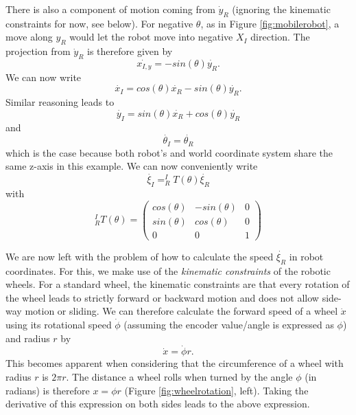 There is also a component of motion coming from $ \dot{y}_R$ (ignoring the kinematic constraints for now, see below).  For negative $ \theta$, as in Figure \ref{fig:mobilerobot}, a move along $y_R$ would let the robot move into negative $ X_I$ direction. The projection from $ \dot{y}_R$ is therefore given by 
\begin{equation}
\dot{x_{I,y}}=-sin(\theta)\dot{y_R}.
\end{equation} 
We can now write
\begin{equation}
\dot{x_I}=cos(\theta) \dot{x_R} - sin(\theta) \dot{y_R}.
\end{equation}
Similar reasoning leads to
\begin{equation}
\dot{y_I}=sin(\theta) \dot{x_R} + cos(\theta) \dot{y_R}
\end{equation}
and
\begin{equation}
\dot{\theta_I}=\dot{\theta_R}
\end{equation}
which is the case because both robot's and world coordinate system share the same z-axis in this example. We can now conveniently write
\begin{equation}
\dot{\xi_I}=^I_RT(\theta)\dot{\xi_R}
\end{equation}
with
\begin{equation}
^I_RT(\theta)=\left(\begin{array}{ccc}
cos(\theta) & -sin(\theta) & 0 \\
sin(\theta) & cos(\theta) & 0 \\
0 & 0 & 1\end{array}\right)
\end{equation}

We are now left with the problem of how to calculate the speed $ \dot{\xi_R}$ in robot coordinates. For this, we make use of the \emph{kinematic constraints} of the robotic wheels. For a standard wheel, the kinematic constraints are that every rotation of the wheel leads to strictly forward or backward motion and does not allow side-way motion or sliding. We can therefore calculate the forward speed of a wheel $ \dot{x}$ using its rotational speed $ \dot{\phi}$ (assuming the encoder value/angle is expressed as $ \phi$) and radius $ r$ by 
\begin{equation}
\dot{x}=\dot{\phi}r.
\end{equation}
This becomes apparent when considering that the circumference of a wheel with radius $ r$ is $ 2\pi r$. The distance a wheel rolls when turned by the angle $ \phi$ (in radians) is therefore $ x=\phi r$ (Figure \ref{fig:wheelrotation}, left). Taking the derivative of this expression on both sides leads to the above expression.

